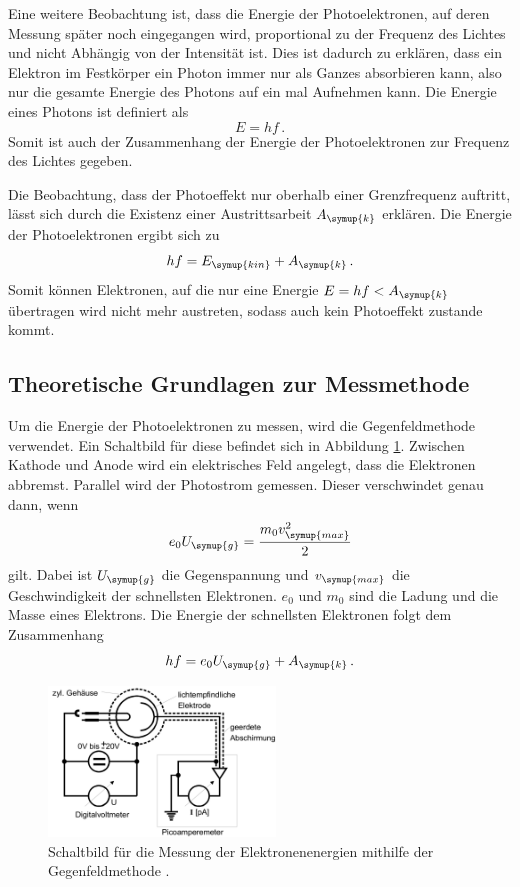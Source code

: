 Eine weitere Beobachtung ist, dass die Energie der Photoelektronen, auf deren Messung später noch
eingegangen wird, proportional zu der Frequenz des Lichtes und nicht Abhängig von der
Intensität ist. Dies ist dadurch zu erklären, dass ein Elektron im Festkörper ein Photon
immer nur als Ganzes absorbieren kann, also nur die gesamte Energie des Photons auf ein mal
Aufnehmen kann. Die Energie eines Photons ist definiert als
\begin{equation}
  E=h f \,.
\end{equation}
Somit ist auch der Zusammenhang der Energie der Photoelektronen zur Frequenz des Lichtes gegeben.

Die Beobachtung, dass der Photoeffekt nur oberhalb einer Grenzfrequenz auftritt, lässt sich
durch die Existenz einer Austrittsarbeit $A_{\symup{k}}$ erklären. Die Energie der
Photoelektronen ergibt sich zu
\begin{equation}
  h f= E_{\symup{kin}}+A_{\symup{k}} \,.
\end{equation}
Somit können Elektronen, auf die nur eine Energie $E=hf<A_{\symup{k}}$ übertragen wird
nicht mehr austreten, sodass auch kein Photoeffekt zustande kommt.

\subsection{Theoretische Grundlagen zur Messmethode}
\label{subsec:Theorie_Messung}

Um die Energie der Photoelektronen zu messen, wird die Gegenfeldmethode verwendet. Ein
Schaltbild für diese befindet sich in Abbildung \ref{fig:schaltbild}. Zwischen
Kathode und Anode wird ein elektrisches Feld angelegt, dass die Elektronen abbremst.
Parallel wird der Photostrom gemessen. Dieser verschwindet genau dann, wenn
\begin{equation}
  e_0 U_{\symup{g}}=\frac{m_0 v_{\symup{max}}^2}{2}
\end{equation}
gilt. Dabei ist $U_{\symup{g}}$ die Gegenspannung und $v_{\symup{max}}$ die
Geschwindigkeit der schnellsten Elektronen. $e_0$ und $m_0$ sind die Ladung und die
Masse eines Elektrons. Die Energie der schnellsten Elektronen folgt dem Zusammenhang
\begin{equation}
  h f=e_0 U_{\symup{g}} + A_{\symup{k}} \,.
\end{equation}

\begin{figure}
  \centering
  \includegraphics[height=4cm]{data/schaltbild.png}
  \caption{Schaltbild für die Messung der Elektronenenergien mithilfe der Gegenfeldmethode \cite{Versuchsanleitung}.}
  \label{fig:schaltbild}
\end{figure}

